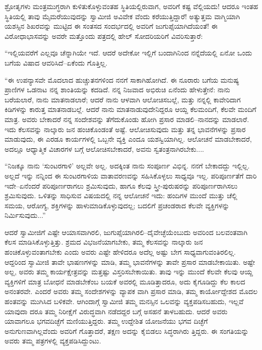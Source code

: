 ಶ್ರೋತೃಗಳು ಮಂತ್ರಮುಗ್ಧರಾಗಿ ಕುಳಿತುಕೊಳ್ಳುವಂತಹ ಸ್ಥಿತಿಯಲ್ಲಿರುವಾಗ, ಅವರಿಗೆ ಕಷ್ಟ ವೆಲ್ಲಿಯದು! ಆದರೂ ಇಂತಹ ಸ್ಥಿತಿಯಲ್ಲಿ ತಾವು ಮೈಮರೆಯುವುದನ್ನು ಸ್ವಾಮೀಜಿ ಅವಿವೇಕ ವೆಂದು ಕರೆಯುತ್ತಿದ್ದಾರೆ! ಅತ್ಯುತ್ತಮ ವಾಗ್ಮಿಯಾಗಿ ಯಶಸ್ಸಿನ ಶಿಖರವನ್ನು ಮುಟ್ಟಿದ ಈ ಸಂತಸದ ಸಂದರ್ಭದಲ್ಲಿ ಅವರಿಗೆ ಜುಗುಪ್ಸೆಯಾಗಿದೆಯಂತೆ! ಈ ವಿರೋಧಾಭಾಸವನ್ನು ಅವರೇ ಮತ್ತೊಂದು ಪತ್ರದಲ್ಲಿ ಹೇಲ್ ಸೋದರಿಯರಿಗೆ ವಿವರಿಸುತ್ತಾರೆ:

“ಇಲ್ಲಿಯವರೆಗೆ ಎಲ್ಲವೂ ಚೆನ್ನಾಗಿಯೇ ಇದೆ. ಆದರೆ ಅದೇಕೋ ಇಲ್ಲಿಗೆ ಬಂದಾಗಿನಿಂದ ನನ್ನೆದೆಯಲ್ಲಿ ಏನೋ ಒಂದು ಬಗೆಯ ವಿಷಾದ ಆವರಿಸಿದೆ–ಏಕೆಂದು ಗೊತ್ತಿಲ್ಲ.

“ಈ ಉಪನ್ಯಾಸವೇ ಮೊದಲಾದ ಹುಚ್ಚುತನಗಳಿಂದ ನನಗೆ ಸಾಕಾಗಿಹೋಗಿದೆ. ಈ ನೂರಾರು ಬಗೆಯ ಮನುಷ್ಯ ಪ್ರಾಣಿಗಳ ಒಡನಾಟ ನನ್ನ ಶಾಂತಿಯನ್ನು ಕದಡಿದೆ. ನನ್ನ ನಿಜವಾದ ಅಭಿರುಚಿ ಏನೆಂದು ಹೇಳುತ್ತೇನೆ: ನಾನು ಬರೆಯಲಾರೆ, ನಾನು ಮಾತನಾಡಲಾರೆ; ಆದರೆ ನಾನು ಆಳವಾಗಿ ಆಲೋಚಿಸಬಲ್ಲೆ, ಮತ್ತು ನನ್ನಲ್ಲಿ ಕಾವೇರಿದಾಗ ಕಿಡಿಗಳನ್ನು ಕಾರುತ್ತ ಮಾತನಾಡಬಲ್ಲೆ. ಆದರೆ ನಾನು ಮಾತನಾಡುವುದೇನಿದ್ದರೂ ಆಯ್ದ ಕೆಲಮಂದಿಗೆ, ಕೆಲವೇ ಮಂದಿಗೆ ಮಾತ್ರ. ಅವರು ಬೇಕಾದರೆ ನನ್ನ ಸಂದೇಶವನ್ನು ತೆಗೆದುಕೊಂಡು ಹೋಗಿ ಪ್ರಸಾರ ಮಾಡಲಿ–ನಾನದನ್ನು ಮಾಡಲಾರೆ. ಇದು ಕೆಲಸವನ್ನು ನಾಲ್ಕಾರು ಜನ ಹಂಚಿಕೊಂಡಂತೆ ಅಷ್ಟೆ. ಆಲೋಚಿಸುವುದು ಮತ್ತು ತನ್ನ ಭಾವನೆಗಳನ್ನು ಪ್ರಸಾರ ಮಾಡುವುದು, ಈ ಎರಡೂ ಕಾರ್ಯಗಳಲ್ಲಿ ಒಬ್ಬನೇ ವ್ಯಕ್ತಿ ಎಂದೂ ಯಶಸ್ವಿಯಾಗಿಲ್ಲ. ಆಲೋಚನೆ ಮಾಡಬೇಕಾದರೆ, ಅದಲ್ಲೂ ಆಧ್ಯಾತ್ಮಿಕ ವಿಚಾರಗಳ ಬಗ್ಗೆ ಆಲೋಚಿಸಬೇಕಾದರೆ, ಅವನು ಸ್ವತಂತ್ರನಾಗಿರಬೇಕು....

“ನಿಜಕ್ಕೂ ನಾನು ‘ಸುಂಟರಗಾಳಿ’ ಅಲ್ಲವೇ ಅಲ್ಲ. ಅದಕ್ಕಿಂತ ನಾನು ಸಂಪೂರ್ಣ ವಿಭಿನ್ನ. ನನಗೆ ಬೇಕಾದದ್ದು ಇಲ್ಲಿಲ್ಲ. ಅಲ್ಲದೆ ಇನ್ನು ನನ್ನಿಂದ ಈ ಸುಂಟರಗಾಳಿಯ ವಾತಾವರಣವನ್ನು ಸಹಿಸಿಕೊಳ್ಳಲು ಸಾಧ್ಯವೂ ಇಲ್ಲ. ಪರಿಪೂರ್ಣತೆಗೆ ದಾರಿ ಇದೇ–ಏನೆಂದರೆ ಪರಿಪೂರ್ಣರಾಗಲು ಶ್ರಮಿಸುವುದು, ಹಾಗೂ ಕೆಲವು ಸ್ತ್ರೀ-ಪುರುಷರನ್ನು ಪರಿಪೂರ್ಣರಾಗಿಸಲು ಶ್ರಮಿಸುವುದು. ಒಳಿತನ್ನು ಸಾಧಿಸುವ ವಿಷಯದಲ್ಲಿ ನನ್ನ ಆಲೋಚನೆ ಇದು: ಹಂದಿಗಳ ಮುಂದೆ ಮುತ್ತು ಚೆಲ್ಲಿ ಸಮಯ, ಆರೋಗ್ಯ, ಶಕ್ತಿಗಳನ್ನು ಹಾಳುಮಾಡಿಕೊಳ್ಳುವುದಲ್ಲ; ಬದಲಿಗೆ ಪ್ರಚಂಡರಾದ ಕೆಲವೇ ವ್ಯಕ್ತಿಗಳನ್ನು ನಿರ್ಮಿಸುವುದು...”

ಆದರೆ ಸ್ವಾಮೀಜಿಗೆ ಎಷ್ಟೇ ಆಯಾಸವಾಗಿರಲಿ, ಜುಗುಪ್ಸೆಯಾಗಿರಲಿ–ದೈವೇಚ್ಛೆಯೆಂಬುದು ಅವರಿಂದ ಬಲವಂತವಾಗಿ ಕೆಲಸ ಮಾಡಿಸಿಕೊಳ್ಳುತ್ತಿತ್ತು. ಶ್ರಮದ ವಿಭಜನೆಯಾಗಬೇಕು, ತಮ್ಮ ಕೆಲಸವನ್ನು ನಾಲ್ಕಾರು ಜನ ಹಂಚಿಕೊಳ್ಳುವಂತಾಗಬೇಕು ಎಂದು ಅವರು ಎಷ್ಟೇ ಹೇಳಿದರೂ ಅದೆಲ್ಲ ಅಷ್ಟು ಬೇಗ ಸಾಧ್ಯವಾಗುವಂತಿರಲಿಲ್ಲ. ಆದ್ದರಿಂದ ಸ್ವಾಮೀಜಿ ತಾವೇ ಭಾಷಣಗಳನ್ನು ಮಾಡಿ, ತಮ್ಮ ಭಾವನೆಗಳನ್ನು ತಾವೇ ಪ್ರಸಾರ ಮಾಡಬೇಕಾಯಿತು. ಅಷ್ಟೇ ಅಲ್ಲ, ಅವರು ತಮ್ಮ ಕಾರ್ಯಕ್ಷೇತ್ರವನ್ನು ಮತ್ತಷ್ಟು ವಿಸ್ತರಿಸಬೇಕಾಯಿತು. ತಾವು ಇನ್ನು ಮುಂದೆ ಕೆಲವೇ ಕೆಲವು ಆಯ್ದ ವ್ಯಕ್ತಿಗಳಿಗೆ ಮಾತ್ರ ಬೋಧನೆ ಮಾಡಬೇಕೆಂಬ ಬಯಕೆ ಅವರಲ್ಲಿ ಮೂಡಿತ್ತಾದರೂ, ಅದು ಕೈಗೂಡಿದ್ದು ಕೆಲ ಕಾಲದ ಅನಂತರವೇ. ಎಂದರೆ ಅವರು ತಮ್ಮ ಸಂದೇಶಗಳನ್ನು ವ್ಯಾಪಕ ವಾಗಿ ಪ್ರಸಾರ ಮಾಡಿ, ತಮ್ಮ ಕಾರ್ಯೋದ್ದೇಶದ ಮೊದಲ ಹಂತವನ್ನು ಮುಗಿಸಿದ ಬಳಿಕವೇ. ಆಗಿಂದಾಗ್ಗೆ ಸ್ವಾಮೀಜಿ ತಮ್ಮ ಮನಸ್ಸಿನ ಒಲವನ್ನು ವ್ಯಕ್ತಪಡಿಸಬಹುದು, ಇಲ್ಲವೆ ಯಾವುದಾ ದರೂ ತಮ್ಮ ನಿರೀಕ್ಷೆಗೆ ವಿರುದ್ಧವಾಗಿ ನಡೆದದ್ದರ ಬಗ್ಗೆ ಅಸಹನೆ ತಾಳಬಹುದು. ಆದರೆ ಅವರು ಯಾವಾಗಲೂ ಭಗವದಿಚ್ಛೆಗೆ ಮಣಿಯುತ್ತಿದ್ದರು. ತಮ್ಮ ಉದ್ದೇಶಿತ ಯೋಜನೆಯು ಭಗವ ದಿಚ್ಛೆಗೆ ಅನುಗುಣವಾಗಿಲ್ಲವೆಂದು ಅವರಿಗೆ ಗೊತ್ತಾದರೆ, ತಕ್ಷಣ ಅದನ್ನು ಕೈಬಿಡಲು ಸಿದ್ಧರಾಗಿರು ತ್ತಿದ್ದರು. ಈ ಸಂಗತಿಯನ್ನು ಅವರು ತಮ್ಮ ಪತ್ರಗಳಲ್ಲಿ ವ್ಯಕ್ತಪಡಿಸಿದ್ದುಂಟು.

